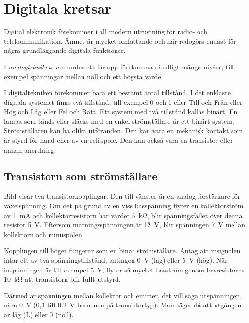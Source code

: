 \section{Digitala kretsar}
\label{digitala kretsar}

Digital elektronik förekommer i all modern utrustning för radio- och
telekommunikation.
Ämnet är mycket omfattande och här redogörs endast för några grundläggande
digitala funktioner.

I \emph{analogtekniken} kan under ett förlopp förekomma oändligt många nivåer,
till exempel spänningar mellan noll och ett högsta värde.

I digitaltekniken förekommer bara ett bestämt antal tillstånd.
I det enklaste digitala systemet finns två tillstånd, till exempel 0 och 1 eller
Till och Från eller Hög och Låg eller Fel och Rätt.
Ett system med två tillstånd kallas binärt.
En lampa som tänds eller släcks med en enkel strömställare är ett binärt system.
Strömställaren kan ha olika utföranden.
Den kan vara en mekanisk kontakt som är styrd för hand eller av en reläspole.
Den kan också vara en transistor eller annan anordning.

\subsection{Transistorn som strömställare}
\label{transistor_strömställare}


Bild  visar två transistorkopplingar.
Den till vänster är en analog förstärkare för växelspänning.
Om det på grund av en viss basspänning flyter en kollektorström av
\qty{1}{\milli\ampere} och kollektorresistorn har värdet \qty{5}{\kilo\ohm},
blir spänningsfallet över denna resistor \qty{5}{\volt}.
Eftersom matningsspänningen är \qty{12}{\volt}, blir spänningen \qty{7}{\volt}
mellan kollektorn och minuspolen.

Kopplingen till höger fungerar som en binär strömställare.
Antag att insignalen intar ett av två spänningstillstånd, antingen
\qty{0}{\volt} (låg) eller \qty{5}{\volt} (hög).
När inspänningen är till exempel \qty{5}{\volt}, flyter så mycket basström genom
basresistorns \qty{10}{\kilo\ohm} att transistorn blir fullt utstyrd.

Därmed är spänningen mellan kollektor och emitter, det vill säga utspänningen,
nära \qty{0}{\volt} (0,1 till \qty{0,2}{\volt} beroende på transistortyp).
Man säger då att utgången är låg (L) eller 0 (noll).

